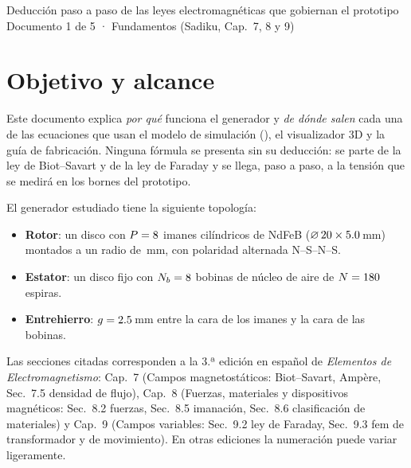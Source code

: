 \documentclass[11pt]{article}
\begin{document}
        {Deducción paso a paso de las leyes electromagnéticas que gobiernan el prototipo}
        {Documento 1 de 5 · Fundamentos (Sadiku, Cap.~7, 8 y 9)}

\tableofcontents
\newpage

\section{Objetivo y alcance}

Este documento explica \emph{por qué} funciona el generador y \emph{de dónde salen} cada una de las
ecuaciones que usan el modelo de simulación (), el visualizador 3D y la
guía de fabricación. Ninguna fórmula se presenta sin su deducción: se parte de la ley de Biot--Savart y de
la ley de Faraday y se llega, paso a paso, a la tensión que se medirá en los bornes del prototipo.

El generador estudiado tiene la siguiente topología:
\begin{itemize}
  \item \textbf{Rotor}: un disco con $P=8$ imanes cilíndricos de NdFeB
        ($\varnothing\,20\times5.0$\,mm) montados a un radio de \ValRadioMontaje\,mm,
        con polaridad alternada N--S--N--S.
  \item \textbf{Estator}: un disco fijo con $N_b=8$ bobinas de núcleo de aire de $N=180$ espiras.
  \item \textbf{Entrehierro}: $g=2.5$\,mm entre la cara de los imanes y la cara de las bobinas.
\end{itemize}

\begin{nota}
Las secciones citadas corresponden a la 3.ª edición en español de \emph{Elementos de Electromagnetismo}:
Cap.~7 (Campos magnetostáticos: Biot--Savart, Ampère, Sec.~7.5 densidad de flujo),
Cap.~8 (Fuerzas, materiales y dispositivos magnéticos: Sec.~8.2 fuerzas, Sec.~8.5 imanación,
Sec.~8.6 clasificación de materiales) y Cap.~9 (Campos variables: Sec.~9.2 ley de Faraday,
Sec.~9.3 fem de transformador y de movimiento). En otras ediciones la numeración puede variar ligeramente.
\end{nota}

\end{document}
